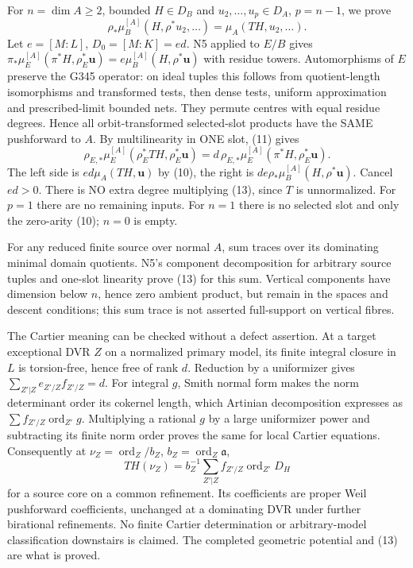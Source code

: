 \documentclass[11pt]{article}
\begin{document}
For $n=\dim A\ge2$, bounded $H\in D_B$ and $u_2,\ldots,u_p\in D_A$, $p=n-1$, we prove
\[
 \rho_*\mu_B^{[A]}(H,\rho^*u_2,\ldots)=\mu_A(TH,u_2,\ldots). \tag{13}
\]
Let $e=[M:L]$, $D_0=[M:K]=ed$. N5 applied to $E/B$ gives
$\pi_*\mu_E^{[A]}(\pi^*H,\rho_E^*\boldsymbol u)=e\mu_B^{[A]}(H,\rho^*\boldsymbol u)$ with residue towers. Automorphisms of $E$ preserve the G345 operator: on ideal tuples this follows from quotient-length isomorphisms and transformed tests, then dense tests, uniform approximation and prescribed-limit bounded nets. They permute centres with equal residue degrees. Hence all orbit-transformed selected-slot products have the SAME pushforward to $A$. By multilinearity in ONE slot, (11) gives
\[
 \rho_{E,*}\mu_E^{[A]}(\rho_E^*TH,\rho_E^*\boldsymbol u)
 =d\,\rho_{E,*}\mu_E^{[A]}(\pi^*H,\rho_E^*\boldsymbol u).
\]
The left side is $ed\mu_A(TH,\boldsymbol u)$ by (10), the right is $de\rho_*\mu_B^{[A]}(H,\rho^*\boldsymbol u)$. Cancel $ed>0$. There is NO extra degree multiplying (13), since $T$ is unnormalized. For $p=1$ there are no remaining inputs. For $n=1$ there is no selected slot and only the zero-arity (10); $n=0$ is empty.

For any reduced finite source over normal $A$, sum traces over its dominating minimal domain quotients. N5's component decomposition for arbitrary source tuples and one-slot linearity prove (13) for this sum. Vertical components have dimension below $n$, hence zero ambient product, but remain in the spaces and descent conditions; this sum trace is not asserted full-support on vertical fibres.

The Cartier meaning can be checked without a defect assertion. At a target exceptional DVR $Z$ on a normalized primary model, its finite integral closure in $L$ is torsion-free, hence free of rank $d$. Reduction by a uniformizer gives $\sum_{Z'|Z}e_{Z'/Z}f_{Z'/Z}=d$. For integral $g$, Smith normal form makes the norm determinant order its cokernel length, which Artinian decomposition expresses as $\sum f_{Z'/Z}\operatorname{ord}_{Z'}g$. Multiplying a rational $g$ by a large uniformizer power and subtracting its finite norm order proves the same for local Cartier equations. Consequently at $\nu_Z=\operatorname{ord}_Z/b_Z$, $b_Z=\operatorname{ord}_Z\mathfrak a$,
\[
 TH(\nu_Z)=b_Z^{-1}\sum_{Z'|Z} f_{Z'/Z}\operatorname{ord}_{Z'}D_H
\]
for a source core on a common refinement. Its coefficients are proper Weil pushforward coefficients, unchanged at a dominating DVR under further birational refinements. No finite Cartier determination or arbitrary-model classification downstairs is claimed. The completed geometric potential and (13) are what is proved.
\end{document}
